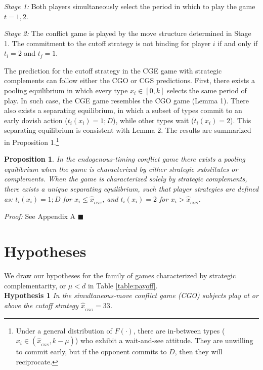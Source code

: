 \documentclass[12pt, letterpaper]{article}
\theoremstyle{plain}
\begin{document}
 \textit{Stage 1:} Both players simultaneously select the period in which to play the game $t=1,2$. 

\textit{Stage 2:} The conflict game is played by the move structure determined in Stage 1. The commitment to the cutoff strategy is not binding for player $i$ if and only if $t_i=2$ and $t_j=1$. 

The prediction for the cutoff strategy in the CGE game with strategic complements can follow either the CGO or CGS predictions. First, there exists a pooling equilibrium in which every type $x_i \in [0,k]$ selects the same period of play. In such case, the CGE game resembles the CGO game (Lemma 1). There also exists a separating equilibrium, in which a subset of types commit to an early dovish action ($t_{i}(x_i)=1; D$), while other types wait ($t_{i}(x_i)=2$). This separating equilibrium is consistent with Lemma 2. The results are summarized in Proposition 1.\footnote{Under a general distribution of $F(\cdot)$, there are in-between types ($x_i \in ( \hat{x}_{_{CGS}}, k-\mu)$) who exhibit a wait-and-see attitude. They are unwilling to commit early, but if the opponent commits to $D$, then they will reciprocate.}

\newtheorem{prop}{Proposition}
\begin{prop}
In the endogenous-timing conflict game there exists a pooling equilibrium  when the game is characterized by either strategic substitutes or complements. When the game is characterized solely by strategic complements, there exists a unique separating equilibrium, such that player strategies are defined as: $t_{i}(x_i)=1; D$ for $x_i\leq \hat{x}_{_{CGS}}$, and $t_{i}(x_i)=2$ for $x_i>\hat{x}_{_{CGS}}$. 

\end{prop}\par
\noindent \textit{Proof:} See Appendix A $\blacksquare$

\section{Hypotheses}

We draw our hypotheses for the family of games characterized by strategic complementarity, or $\mu<d$ in Table \ref{table:payoff}. \\

\noindent \textbf{Hypothesis 1}
\textit{In the simultaneous-move conflict game (CGO) subjects play at or above the cutoff strategy $\hat{x}_{_{CGO}}=33$.}\\
\end{document}
